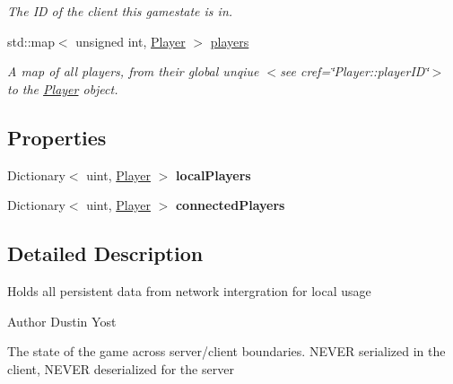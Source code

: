\begin{DoxyCompactItemize}
\begin{DoxyCompactList}\small\item\em The I\-D of the client this gamestate is in. \end{DoxyCompactList}\item 
\hypertarget{class_game_state_a8f156a6cce5f2b9945c274b6bfc971ce}{std\-::map$<$ unsigned int, \hyperlink{class_game_state_1_1_player}{Player} $>$ \hyperlink{class_game_state_a8f156a6cce5f2b9945c274b6bfc971ce}{players}}\label{class_game_state_a8f156a6cce5f2b9945c274b6bfc971ce}

\begin{DoxyCompactList}\small\item\em A map of all players, from their global unqiue $<$see cref=\char`\"{}\-Player\-::player\-I\-D\char`\"{}$>$ to the \hyperlink{class_game_state_1_1_player}{Player} object. \end{DoxyCompactList}\end{DoxyCompactItemize}
\subsection*{Properties}
\begin{DoxyCompactItemize}
\item 
\hypertarget{class_game_state_a3fe38a9e11fe72dd4bc4796e1d4a6c1b}{Dictionary$<$ uint, \hyperlink{class_game_state_1_1_player}{Player} $>$ {\bfseries local\-Players}}\label{class_game_state_a3fe38a9e11fe72dd4bc4796e1d4a6c1b}

\item 
\hypertarget{class_game_state_ad0f225ac26f38bf21be10d35a1cd6011}{Dictionary$<$ uint, \hyperlink{class_game_state_1_1_player}{Player} $>$ {\bfseries connected\-Players}}\label{class_game_state_ad0f225ac26f38bf21be10d35a1cd6011}

\end{DoxyCompactItemize}


\subsection{Detailed Description}
Holds all persistent data from network intergration for local usage 

\begin{DoxyAuthor}{Author}
Dustin Yost
\end{DoxyAuthor}
The state of the game across server/client boundaries. N\-E\-V\-E\-R serialized in the client, N\-E\-V\-E\-R deserialized for the server 

